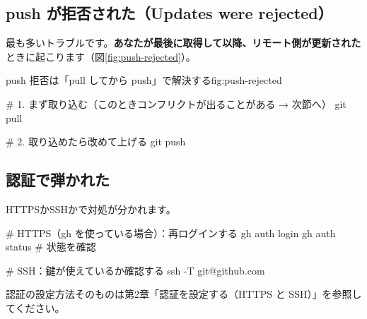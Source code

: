 \subsection{push が拒否された（Updates were rejected）}

最も多いトラブルです。\textbf{あなたが最後に取得して以降、リモート側が更新された}ときに起こります（図\ref{fig:push-rejected}）。

\begin{numfig}{push 拒否は「pull してから push」で解決する}{fig:push-rejected}
\end{numfig}

\begin{codebox}[bash]
\begin{code}
# 1. まず取り込む（このときコンフリクトが出ることがある → 次節へ）
git pull

# 2. 取り込めたら改めて上げる
git push
\end{code}
\end{codebox}

\subsection{認証で弾かれた}

HTTPSかSSHかで対処が分かれます。

\begin{codebox}[bash]
\begin{code}
# HTTPS（gh を使っている場合）：再ログインする
gh auth login
gh auth status   # 状態を確認

# SSH：鍵が使えているか確認する
ssh -T git@github.com
\end{code}
\end{codebox}

認証の設定方法そのものは第2章「認証を設定する（HTTPS と SSH）」を参照してください。

